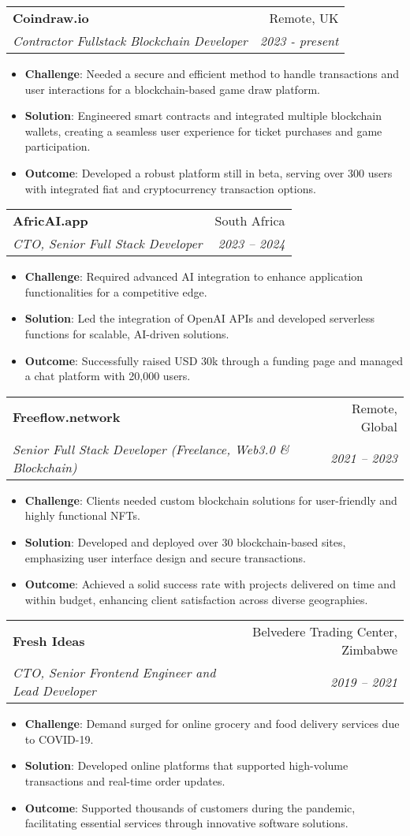 \documentclass[letterpaper,11pt]{article}
\makeatletter
\newcommand{\resumeItem}[2]{
  \item\small{
    \textbf{#1}{: #2 \vspace{-2pt}}
  }
}
\newcommand{\resumeSubheading}[4]{
  \vspace{-1pt}\item
    \begin{tabular*}{0.97\textwidth}[t]{l@{\extracolsep{\fill}}r}
      \textbf{#1} & #2 \\
      \textit{\small#3} & \textit{\small #4} \\
    \end{tabular*}\vspace{-5pt}
}
\newcommand{\resumeItemListStart}{\begin{itemize}}
\newcommand{\resumeItemListEnd}{\end{itemize}\vspace{-5pt}}
\makeatother
\begin{document}
    \resumeSubheading
      {Coindraw.io}{Remote, UK}
      {Contractor Fullstack Blockchain Developer}{2023 - present}
      \resumeItemListStart
        \resumeItem{Challenge}
          {Needed a secure and efficient method to handle transactions and user interactions for a blockchain-based game draw platform.}
        \resumeItem{Solution}
          {Engineered smart contracts and integrated multiple blockchain wallets, creating a seamless user experience for ticket purchases and game participation.}
        \resumeItem{Outcome}
          {Developed a robust platform still in beta, serving over 300 users with integrated fiat and cryptocurrency transaction options.}
      \resumeItemListEnd

    \resumeSubheading
      {AfricAI.app}{South Africa}
      {CTO, Senior Full Stack Developer}{2023 – 2024}
      \resumeItemListStart
        \resumeItem{Challenge}
          {Required advanced AI integration to enhance application functionalities for a competitive edge.}
        \resumeItem{Solution}
          {Led the integration of OpenAI APIs and developed serverless functions for scalable, AI-driven solutions.}
        \resumeItem{Outcome}
          {Successfully raised USD 30k through a funding page and managed a chat platform with 20,000 users.}
      \resumeItemListEnd

    \resumeSubheading
      {Freeflow.network}{Remote, Global}
      {Senior Full Stack Developer (Freelance, Web3.0 \& Blockchain)}{2021 – 2023}
      \resumeItemListStart
        \resumeItem{Challenge}
          {Clients needed custom blockchain solutions for user-friendly and highly functional NFTs.}
        \resumeItem{Solution}
          {Developed and deployed over 30 blockchain-based sites, emphasizing user interface design and secure transactions.}
        \resumeItem{Outcome}
          {Achieved a solid success rate with projects delivered on time and within budget, enhancing client satisfaction across diverse geographies.}
      \resumeItemListEnd

    \resumeSubheading
      {Fresh Ideas}{Belvedere Trading Center, Zimbabwe}
      {CTO, Senior Frontend Engineer and Lead Developer}{2019 – 2021}
      \resumeItemListStart
        \resumeItem{Challenge}
          {Demand surged for online grocery and food delivery services due to COVID-19.}
        \resumeItem{Solution}
          {Developed online platforms that supported high-volume transactions and real-time order updates.}
        \resumeItem{Outcome}
          {Supported thousands of customers during the pandemic, facilitating essential services through innovative software solutions.}
      \resumeItemListEnd
\end{document}
